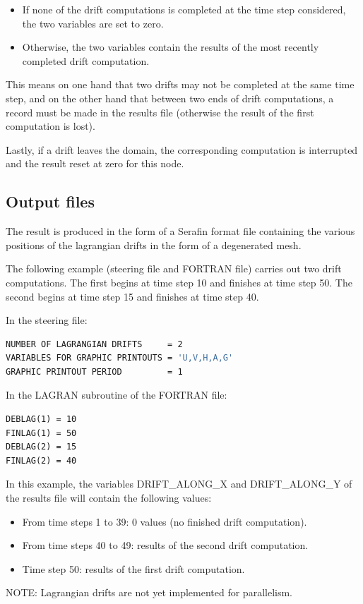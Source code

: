 \begin{itemize}
\item  If none of the drift computations is completed at the time step considered, the two variables are set to zero.

\item  Otherwise, the two variables contain the results of the most recently completed drift computation.
\end{itemize}

 This means on one hand that two drifts may not be completed at the same time step, and on the other hand that between two ends of drift computations, a record must be made in the results file (otherwise the result of the first computation is lost).

 Lastly, if a drift leaves the domain, the corresponding computation is interrupted and the result reset at zero for this node.


\subsection{ Output files}

 The result is produced in the form of a Serafin format file containing the various positions of the lagrangian drifts in the form of a degenerated mesh.



  The following example (steering file and FORTRAN file) carries out two drift computations. The first begins at time step 10 and finishes at time step 50. The second begins at time step 15 and finishes at time step 40.

  In the steering file:
\begin{lstlisting}[language=bash]
NUMBER OF LAGRANGIAN DRIFTS     = 2
VARIABLES FOR GRAPHIC PRINTOUTS = 'U,V,H,A,G'
GRAPHIC PRINTOUT PERIOD         = 1
\end{lstlisting}
  In the LAGRAN subroutine of the FORTRAN file:
\begin{lstlisting}[language=TelFortran]
DEBLAG(1) = 10
FINLAG(1) = 50
DEBLAG(2) = 15
FINLAG(2) = 40
\end{lstlisting}
 In this example, the variables DRIFT\_ALONG\_X and DRIFT\_ALONG\_Y of the results file will contain the following values:

\begin{itemize}
\item  From time steps 1 to 39: 0 values (no finished drift computation).

\item  From time steps 40 to 49: results of the second drift computation.

\item  Time step 50: results of the first drift computation.
\end{itemize}

 NOTE: Lagrangian drifts are not yet implemented for parallelism.

